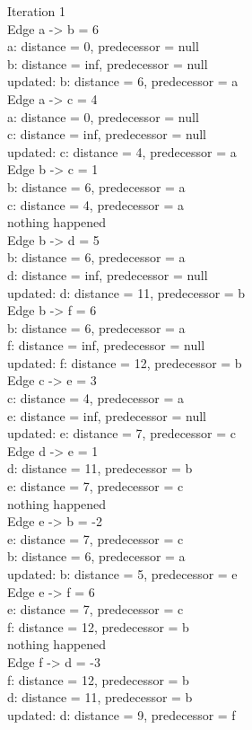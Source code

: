 \noindent Iteration 1\\
Edge a -> b = 6\\
a: distance = 0, predecessor = null\\
b: distance = inf, predecessor = null\\
updated: b: distance = 6, predecessor = a\\
Edge a -> c = 4\\
a: distance = 0, predecessor = null\\
c: distance = inf, predecessor = null\\
updated: c: distance = 4, predecessor = a\\
Edge b -> c = 1\\
b: distance = 6, predecessor = a\\
c: distance = 4, predecessor = a\\
nothing happened\\
Edge b -> d = 5\\
b: distance = 6, predecessor = a\\
d: distance = inf, predecessor = null\\
updated: d: distance = 11, predecessor = b\\
Edge b -> f = 6\\
b: distance = 6, predecessor = a\\
f: distance = inf, predecessor = null\\
updated: f: distance = 12, predecessor = b\\
Edge c -> e = 3\\
c: distance = 4, predecessor = a\\
e: distance = inf, predecessor = null\\
updated: e: distance = 7, predecessor = c\\
Edge d -> e = 1\\
d: distance = 11, predecessor = b\\
e: distance = 7, predecessor = c\\
nothing happened\\
Edge e -> b = -2\\
e: distance = 7, predecessor = c\\
b: distance = 6, predecessor = a\\
updated: b: distance = 5, predecessor = e\\
Edge e -> f = 6\\
e: distance = 7, predecessor = c\\
f: distance = 12, predecessor = b\\
nothing happened\\
Edge f -> d = -3\\
f: distance = 12, predecessor = b\\
d: distance = 11, predecessor = b\\
updated: d: distance = 9, predecessor = f\\

